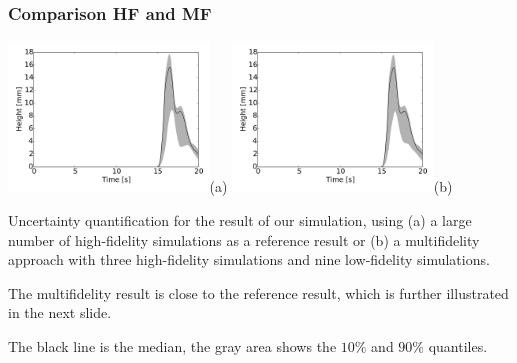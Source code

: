 \documentclass[11pt,ucs]{beamer}
\begin{document}
\begin{frame}\frametitle{Comparison HF and MF}

\begin{center}
\includegraphics[width=0.4\textwidth]{illustrate1d_reference}\textsf{(a)}
\includegraphics[width=0.4\textwidth]{illustrate1d_cheap}\textsf{(b)}
\end{center}

\small{
Uncertainty quantification for the result of our simulation, using 
(a) a large number of high-fidelity simulations as a reference result or 
(b) a multifidelity approach with three high-fidelity simulations and nine low-fidelity simulations. 

The multifidelity result is close to the reference result, which is further illustrated in the next slide.

The black line is the median, the gray area shows the $10\%$ and $90\%$ quantiles. }



\end{frame}
\end{document}
